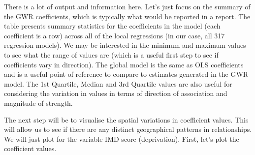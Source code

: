 \documentclass[
]{book}
\newenvironment{Shaded}{\begin{snugshade}}{\end{snugshade}}
\newcommand{\AttributeTok}[1]{\textcolor[rgb]{0.77,0.63,0.00}{#1}}
\newcommand{\CommentTok}[1]{\textcolor[rgb]{0.56,0.35,0.01}{\textit{#1}}}
\newcommand{\DecValTok}[1]{\textcolor[rgb]{0.00,0.00,0.81}{#1}}
\newcommand{\FunctionTok}[1]{\textcolor[rgb]{0.00,0.00,0.00}{#1}}
\newcommand{\NormalTok}[1]{#1}
\newcommand{\OtherTok}[1]{\textcolor[rgb]{0.56,0.35,0.01}{#1}}
\newcommand{\SpecialCharTok}[1]{\textcolor[rgb]{0.00,0.00,0.00}{#1}}
\newcommand{\StringTok}[1]{\textcolor[rgb]{0.31,0.60,0.02}{#1}}
\begin{document}
There is a lot of output and information here. Let's just focus on the summary of the GWR coefficients, which is typically what would be reported in a report. The table presents summary statistics for the coefficients in the model (each coefficient is a row) across all of the local regressions (in our case, all 317 regression models). We may be interested in the minimum and maximum values to see what the range of values are (which is a useful first step to see if coefficients vary in direction). The global model is the same as OLS coefficients and is a useful point of reference to compare to estimates generated in the GWR model. The 1st Quartile, Median and 3rd Quartile values are also useful for considering the variation in values in terms of direction of association and magnitude of strength.

The next step will be to visualise the spatial variations in coefficient values. This will allow us to see if there are any distinct geographical patterns in relationships. We will just plot for the variable IMD score (deprivation). First, let's plot the coefficient values.

\begin{Shaded}
\end{Shaded}
\end{document}
